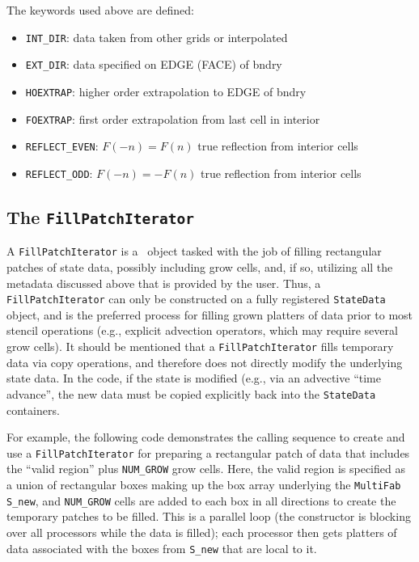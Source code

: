 The keywords used above are defined:
\begin{itemize}
\item {\tt INT\_DIR}: data taken from other grids or interpolated

\item {\tt EXT\_DIR}: data specified on EDGE (FACE) of bndry

\item {\tt HOEXTRAP}: higher order extrapolation to EDGE of bndry

\item {\tt FOEXTRAP}: first order extrapolation from last cell in interior

\item {\tt REFLECT\_EVEN}: $F(-n) = F(n)$ true reflection from interior cells

\item {\tt REFLECT\_ODD}: $F(-n) = -F(n)$ true reflection from interior cells
\end{itemize}


\subsection{The {\tt FillPatchIterator}}

A {\tt FillPatchIterator} is a \boxlib\ object tasked with the job of
filling rectangular patches of state data, possibly including grow cells,
and, if so, utilizing all the metadata  discussed above that is provided by
the user.  Thus, a {\tt FillPatchIterator} can only be constructed on
a fully registered {\tt StateData} object, and is the preferred 
process for filling grown platters of data prior to most stencil 
operations (e.g., explicit advection operators, which may require 
several grow cells).  It should be mentioned that a {\tt FillPatchIterator}
fills temporary data via copy operations, and therefore does not
directly modify the underlying state data.  In the code, if the state
is modified (e.g., via an advective ``time advance'', the new data
must be copied explicitly back into the {\tt StateData} containers.

For example, the following code demonstrates the calling sequence to
create and use a {\tt FillPatchIterator} for preparing a rectangular patch of 
data that includes the ``valid region'' plus {\tt NUM\_GROW} grow cells.  Here,
the valid region is specified as a union of rectangular boxes making up the 
box array underlying the {\tt MultiFab S\_new}, and {\tt NUM\_GROW} cells are 
added to each box in all directions to create the temporary patches to
be filled.  This is a parallel loop (the constructor is blocking over all
processors while the data is filled); each processor then gets platters of data
associated with the boxes from {\tt S\_new} that are local to it.


